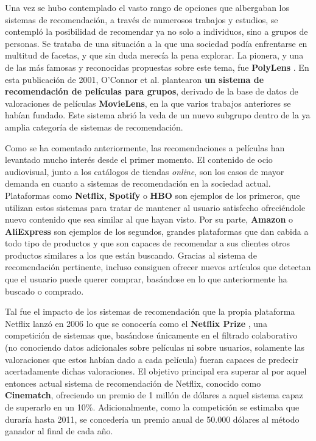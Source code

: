 Una vez se hubo contemplado el vasto rango de opciones que albergaban los sistemas de recomendación, a través de numerosos trabajos y estudios, se contempló la posibilidad de recomendar ya no solo a individuos, sino a grupos de personas. Se trataba de una situación a la que una sociedad podía enfrentarse en multitud de facetas, y que sin duda merecía la pena explorar. La pionera, y una de las más famosas y reconocidas propuestas sobre este tema, fue \textbf{PolyLens} \cite{polylens}. En esta publicación de 2001, O'Connor et al. plantearon \textbf{un sistema de recomendación de películas para grupos}, derivado de la base de datos de valoraciones de películas \textbf{MovieLens}, en la que varios trabajos anteriores se habían fundado. Este sistema abrió la veda de un nuevo subgrupo dentro de la ya amplia categoría de sistemas de recomendación.

Como se ha comentado anteriormente, las recomendaciones a películas han levantado mucho interés desde el primer momento. El contenido de ocio audiovisual, junto a los catálogos de tiendas \textit{online}, son los casos de mayor demanda en cuanto a sistemas de recomendación en la sociedad actual. Plataformas como \textbf{Netflix}, \textbf{Spotify} o \textbf{HBO} son ejemplos de los primeros, que utilizan estos sistemas para tratar de mantener al usuario satisfecho ofreciéndole nuevo contenido que sea similar al que hayan visto. Por su parte, \textbf{Amazon} o \textbf{AliExpress} son ejemplos de los segundos, grandes plataformas que dan cabida a todo tipo de productos y que son capaces de recomendar a sus clientes otros productos similares a los que están buscando. Gracias al sistema de recomendación pertinente, incluso consiguen ofrecer nuevos artículos que detectan que el usuario puede querer comprar, basándose en lo que anteriormente ha buscado o comprado.

Tal fue el impacto de los sistemas de recomendación que la propia plataforma Netflix lanzó en 2006 lo que se conocería como el \textbf{Netflix Prize} \cite{netflix-prize}, una competición de sistemas que, basándose únicamente en el filtrado colaborativo (no conociendo datos adicionales sobre películas ni sobre usuarios, solamente las valoraciones que estos habían dado a cada película) fueran capaces de predecir acertadamente dichas valoraciones. El objetivo principal era superar al por aquel entonces actual sistema de recomendación de Netflix, conocido como \textbf{Cinematch}, ofreciendo un premio de 1 millón de dólares a aquel sistema capaz de superarlo en un 10\%. Adicionalmente, como la competición se estimaba que duraría hasta 2011, se concedería un premio anual de 50.000 dólares al método ganador al final de cada año.

